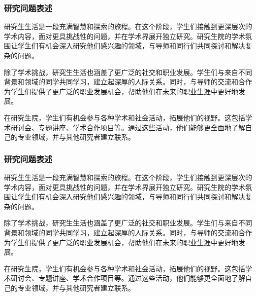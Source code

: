 \subsubsection{研究问题表述}
研究生生活是一段充满智慧和探索的旅程。在这个阶段，学生们接触到更深层次的学术内容，面对更具挑战性的问题，并在学术界展开独立研究。研究生院的学术氛围让学生们有机会深入研究他们感兴趣的领域，与导师和同行们共同探讨和解决复杂的问题。

除了学术挑战，研究生生活也涵盖了更广泛的社交和职业发展。学生们与来自不同背景和领域的同学共同学习，建立起深厚的人际关系。同时，与导师的交流和合作为学生们提供了更广泛的职业发展机会，帮助他们在未来的职业生涯中更好地发展。

在研究生院，学生们有机会参与各种学术和社会活动，拓展他们的视野。这包括学术研讨会、专题讲座、学术合作项目等。通过这些活动，他们能够更全面地了解自己的专业领域，并与其他研究者建立联系。

\subsubsection{研究问题表述}

研究生生活是一段充满智慧和探索的旅程。在这个阶段，学生们接触到更深层次的学术内容，面对更具挑战性的问题，并在学术界展开独立研究。研究生院的学术氛围让学生们有机会深入研究他们感兴趣的领域，与导师和同行们共同探讨和解决复杂的问题。

除了学术挑战，研究生生活也涵盖了更广泛的社交和职业发展。学生们与来自不同背景和领域的同学共同学习，建立起深厚的人际关系。同时，与导师的交流和合作为学生们提供了更广泛的职业发展机会，帮助他们在未来的职业生涯中更好地发展。

在研究生院，学生们有机会参与各种学术和社会活动，拓展他们的视野。这包括学术研讨会、专题讲座、学术合作项目等。通过这些活动，他们能够更全面地了解自己的专业领域，并与其他研究者建立联系。